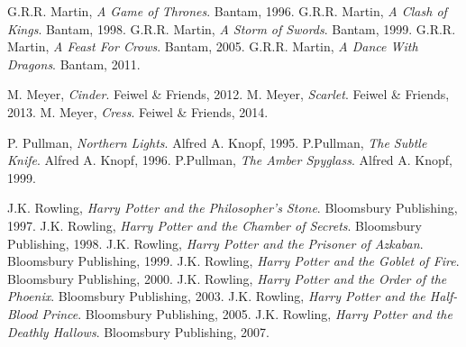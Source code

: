 \begin{thebibliography}{99}
    G.R.R. Martin,
    \emph{A Game of Thrones}.
    Bantam, 
    1996.       
    G.R.R. Martin,
    \emph{A Clash of Kings}.
    Bantam, 
    1998.       
    G.R.R. Martin,
    \emph{A Storm of Swords}.
    Bantam, 
    1999.       
    G.R.R. Martin,
    \emph{A Feast For Crows}.
    Bantam, 
    2005.       
    G.R.R. Martin,
    \emph{A Dance With Dragons}.
    Bantam, 
    2011.  

    M. Meyer,
    \emph{Cinder}.
    Feiwel \& Friends,
    2012.
    M. Meyer,
    \emph{Scarlet}.
    Feiwel \& Friends,
    2013.
    M. Meyer,
    \emph{Cress}.
    Feiwel \& Friends,
    2014.

    P. Pullman,
    \emph{Northern Lights}.
    Alfred A. Knopf, 
    1995.     
    P.Pullman,
    \emph{The Subtle Knife}.
    Alfred A. Knopf, 
    1996.   
    P.Pullman,
    \emph{The Amber Spyglass}.
    Alfred A. Knopf, 
    1999.   

    J.K. Rowling,
    \emph{Harry Potter and the Philosopher's Stone}.
    Bloomsbury Publishing, 
    1997.  
    J.K. Rowling,
    \emph{Harry Potter and the Chamber of Secrets}.
    Bloomsbury Publishing, 
    1998.  
    J.K. Rowling,
    \emph{Harry Potter and the Prisoner of Azkaban}.
    Bloomsbury Publishing, 
    1999.  
    J.K. Rowling,
    \emph{Harry Potter and the Goblet of Fire}.
    Bloomsbury Publishing, 
    2000.  
    J.K. Rowling,
    \emph{Harry Potter and the Order of the Phoenix}.
    Bloomsbury Publishing, 
    2003.  
    J.K. Rowling,
    \emph{Harry Potter and the Half-Blood Prince}.
    Bloomsbury Publishing, 
    2005.  
    J.K. Rowling,
    \emph{Harry Potter and the Deathly Hallows}.
    Bloomsbury Publishing, 
    2007.
\end{thebibliography}



